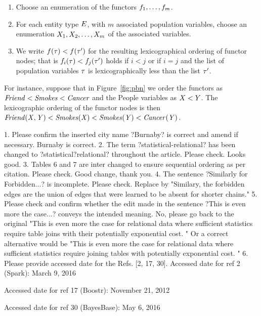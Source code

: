 \begin{enumerate}
\item Choose an enumeration of the functors $f_{1},\ldots,f_{m}$.
\item For each entity type $E$, with $m$ associated population variables, choose an enumeration $X_{1},X_{2},\ldots,X_{m}$ of the associated variables.

\item We write $f(\mathbf{\tau})<f(\mathbf{\tau}')$ for the resulting lexicographical ordering of functor nodes; that is $f_{i}(\mathbf{\tau})<f_{j}(\mathbf{\tau}')$ holds if $i<j$ or if $i=j$ and the list of population variables $\mathbf{\tau}$ is lexicographically less than the list $\mathbf{\tau}'$.
\end{enumerate}

For instance, suppose that in Figure~\ref{fig:pbn} we order the functors as $\it{Friend} < \it{Smokes} < \it{Cancer}$ and the People variables as $X < Y$. The lexicographic ordering of the functor nodes is then $\it{Friend}(X,Y) < \it{Smokes}(X) < \it{Smokes}(Y) < \it{Cancer}(Y)$.

1. Please confirm the inserted city name ?Burnaby? is correct and amend if necessary.
Burnaby is correct.
2. The term ?statistical-relational? has been changed to
?statistical?relational? throughout the article. Please check.
Looks good.
3. Tables 6 and 7 are inter changed to ensure sequential ordering as per citation. Please check.
Good change, thank you.
4. The sentence ?Similarly for Forbidden...? is incomplete. Please check. 
Replace by "Similary, the forbidden edges are the union of  edges that were learned to be absent for shorter chains."
5. Please check and confirm whether the edit made in the sentence ?This is even more the case...? conveys the intended meaning.
No, please go back to the original "This is even more the case for relational data where sufficient statistics require table joins with their potentially exponential cost. " Or a correct alternative would be "This is even more the case for relational data where sufficient statistics require joining tables with potentially exponential cost. "
6. Please provide accessed date for the Refs. [2, 17, 30].
Accessed date for ref 2 (Spark): March 9, 2016

Accessed date for ref 17 (Boostr): November 21, 2012

Accessed date for ref 30 (BayesBase): May 6, 2016

